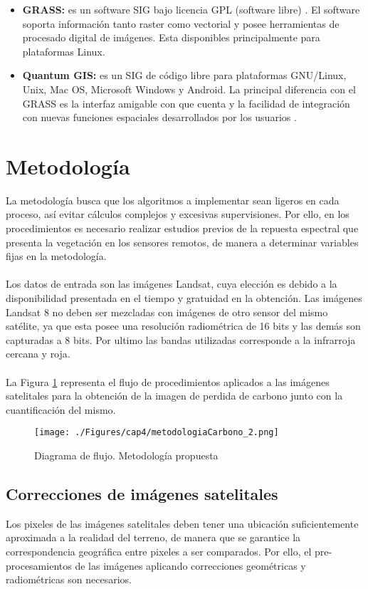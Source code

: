 \begin{itemize}
	\item \textbf{GRASS: }es un software SIG  bajo licencia GPL (software libre) \cite{osgeoGrass}. El software soporta informaci\'on tanto raster como vectorial y posee herramientas de procesado digital de im\'agenes. Esta disponibles principalmente para plataformas Linux.
	\item \textbf{Quantum GIS: }es un SIG de c\'odigo libre para plataformas GNU/Linux, Unix, Mac OS, Microsoft Windows y Android. La principal diferencia con el GRASS es la interfaz amigable con que cuenta y la facilidad de integraci\'on con nuevas funciones espaciales desarrollados por los usuarios \cite{qgisSIG}.
\end{itemize}

\section{Metodolog\'ia}
La metodolog\'ia busca que los algoritmos a implementar sean ligeros en cada proceso, as\'i evitar c\'alculos complejos y excesivas supervisiones. Por ello, en los procedimientos es necesario realizar estudios previos de la repuesta espectral que presenta la vegetaci\'on en los sensores remotos, de manera a determinar variables fijas en la metodolog\'ia.\\~\\
Los datos de entrada son las im\'agenes Landsat, cuya elecci\'on es debido a la disponibilidad presentada en el tiempo y gratuidad en la  obtenci\'on. Las im\'agenes Landsat 8 no deben ser mezcladas con im\'agenes de otro sensor del mismo sat\'elite, ya que esta posee una resoluci\'on radiom\'etrica de 16 bits y las dem\'as son capturadas a 8 bits. Por ultimo las bandas utilizadas corresponde a la infrarroja cercana y roja.\\~\\
La Figura \ref{fig:metodologiapc} representa el flujo de procedimientos aplicados a las im\'agenes satelitales para la obtenci\'on de la imagen de perdida de carbono junto con la cuantificaci\'on del mismo.

\begin{figure}[H]
	\centering
	\texttt{[image: ./Figures/cap4/metodologiaCarbono\_2.png]}
	\caption{Diagrama de flujo. Metodolog\'ia propuesta}
	\label{fig:metodologiapc}
\end{figure}

\subsection{Correcciones de im\'agenes satelitales}\label{sec:coorImsat}
Los pixeles de las im\'agenes satelitales deben tener una ubicaci\'on suficientemente aproximada a la realidad del terreno, de manera que se garantice la correspondencia geogr\'afica entre pixeles a ser comparados. Por ello, el pre-procesamientos de las im\'agenes aplicando correcciones geom\'etricas y radiom\'etricas son necesarios.
